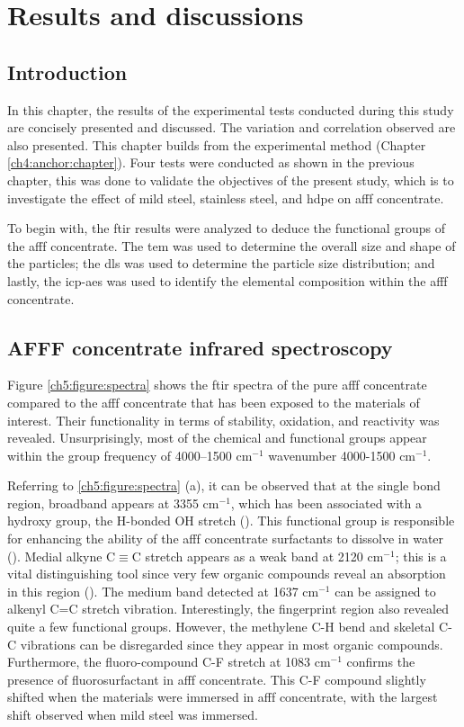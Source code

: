 \chapter{Results and discussions}
\label{ch5:anchor:chapter}
\section{Introduction}
In this chapter, the results of the experimental tests conducted during this study are concisely presented and discussed. The variation and correlation observed are also presented. This chapter builds from the experimental method (Chapter \ref{ch4:anchor:chapter}).  Four tests were conducted as shown in the previous chapter, this was done to validate the objectives of the present study, which is to investigate the effect of mild steel, stainless steel, and \acrshort{hdpe} on \acrshort{afff} concentrate. 

To begin with, the \acrshort{ftir} results were analyzed to deduce the functional groups of the \acrshort{afff} concentrate. The \acrshort{tem} was used to determine the overall size and shape of the particles; the \acrshort{dls} was used to determine the particle size distribution; and lastly, the \acrshort{icp-aes} was used to identify the elemental composition within the \acrshort{afff} concentrate.

\section{AFFF concentrate infrared spectroscopy}
Figure \ref{ch5:figure:spectra} shows the \acrshort{ftir} spectra of the pure \acrshort{afff} concentrate compared to the \acrshort{afff} concentrate that has been exposed to the materials of interest. Their functionality in terms of stability, oxidation, and reactivity was revealed. Unsurprisingly, most of the chemical and functional groups appear within the group frequency of 4000–1500 cm$^{-1}$ wavenumber 4000-1500 cm$^{-1}$.

Referring to \ref{ch5:figure:spectra} (a), it can be observed that at the single bond region, broadband appears at 3355 cm$^{-1}$, which has been associated with a hydroxy group, the H-bonded OH stretch (\cite{krimm1986vibrational}). This functional group is responsible for enhancing the ability of the \acrshort{afff} concentrate surfactants to dissolve in water (\cite{coates1996interpretation}).  Medial alkyne C$\equiv$C stretch appears as a weak band at 2120 cm$^{-1}$; this is a vital distinguishing tool since very few organic compounds reveal an absorption in this region (\cite{bellamy1980infrared}). The medium band detected at 1637 cm$^{-1}$ can be assigned to alkenyl C=C stretch vibration. Interestingly, the fingerprint region also revealed quite a few functional groups. However, the methylene C-H bend and skeletal C-C vibrations can be disregarded since they appear in most organic compounds. Furthermore, the fluoro-compound C-F stretch at 1083 cm$^{-1}$ confirms the presence of fluorosurfactant in \acrshort{afff} concentrate. This C-F compound slightly shifted when the materials were immersed in \acrshort{afff} concentrate, with the largest shift observed when mild steel was immersed.

